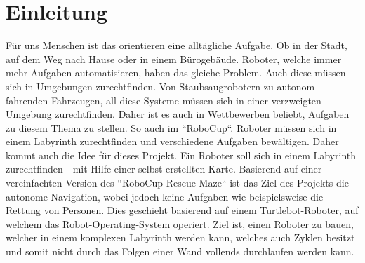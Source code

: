 \section{Einleitung}
{
	Für uns Menschen ist das orientieren eine alltägliche Aufgabe. Ob in der Stadt, auf dem Weg nach Hause oder in einem Bürogebäude. Roboter, welche immer mehr Aufgaben automatisieren, haben das gleiche Problem. Auch diese müssen sich in Umgebungen zurechtfinden. Von Staubsaugrobotern zu autonom fahrenden Fahrzeugen, all diese Systeme müssen sich in einer verzweigten Umgebung zurechtfinden. Daher ist es auch in Wettbewerben beliebt, Aufgaben zu diesem Thema zu stellen. So auch im ``RoboCup``. Roboter müssen sich in einem Labyrinth zurechtfinden und verschiedene Aufgaben bewältigen. Daher kommt auch die Idee für dieses Projekt. Ein Roboter soll sich in einem Labyrinth zurechtfinden - mit Hilfe einer selbst erstellten Karte. Basierend auf einer vereinfachten Version des ``RoboCup Rescue Maze`` ist das Ziel des Projekts die autonome Navigation, wobei jedoch keine Aufgaben wie beispielsweise die Rettung von Personen. Dies geschieht basierend auf einem Turtlebot-Roboter, auf welchem das Robot-Operating-System operiert. Ziel ist, einen Roboter zu bauen, welcher in einem komplexen Labyrinth werden kann, welches auch Zyklen besitzt und somit nicht durch das Folgen einer Wand vollends durchlaufen werden kann.
}